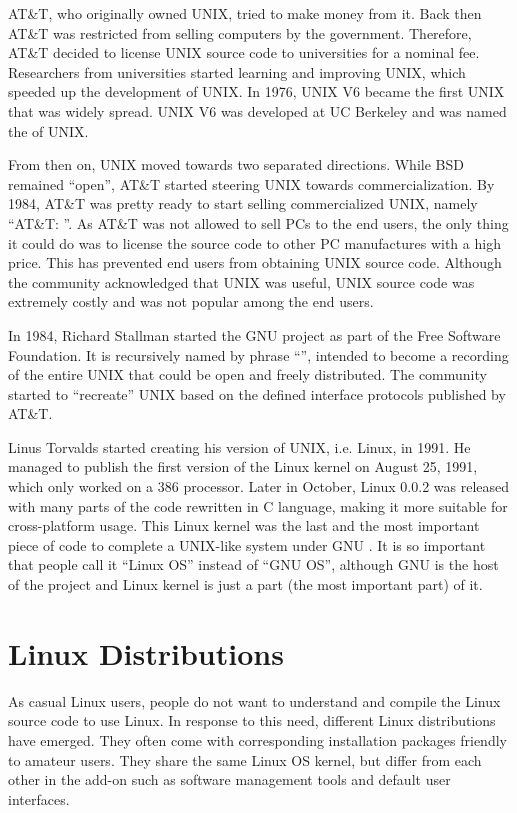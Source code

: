 AT\&T, who originally owned UNIX, tried to make money from it. Back then AT\&T was restricted from selling computers by the government. Therefore, AT\&T decided to license UNIX source code to universities for a nominal fee. Researchers from universities started learning and improving UNIX, which speeded up the development of UNIX. In 1976, UNIX V6 became the first UNIX that was widely spread. UNIX V6 was developed at UC Berkeley and was named the  of UNIX.

From then on, UNIX moved towards two separated directions. While BSD remained ``open'', AT\&T started steering UNIX towards commercialization. By 1984, AT\&T was pretty ready to start selling commercialized UNIX, namely ``AT\&T: ''. As AT\&T was not allowed to sell PCs to the end users, the only thing it could do was to license the source code to other PC manufactures with a high price. This has prevented end users from obtaining UNIX source code. Although the community acknowledged that UNIX was useful, UNIX source code was extremely costly and was not popular among the end users.

In 1984, Richard Stallman started the GNU project as part of the Free Software Foundation. It is recursively named by phrase ``'', intended to become a recording of the entire UNIX that could be open and freely distributed. The community started to ``recreate'' UNIX based on the defined interface protocols published by AT\&T.

Linus Torvalds started creating his version of UNIX, i.e. Linux, in 1991. He managed to publish the first version of the Linux kernel on August 25, 1991, which only worked on a 386 processor. Later in October, Linux 0.0.2 was released with many parts of the code rewritten in C language, making it more suitable for cross-platform usage. This Linux kernel was the last and the most important piece of code to complete a UNIX-like system under GNU . It is so important that people call it ``Linux OS'' instead of ``GNU OS'', although GNU is the host of the project and Linux kernel is just a part (the most important part) of it.

\section{Linux Distributions}

As casual Linux users, people do not want to understand and compile the Linux source code to use Linux. In response to this need, different Linux distributions have emerged. They often come with corresponding installation packages friendly to amateur users. They share the same Linux OS kernel, but differ from each other in the add-on such as software management tools and default user interfaces.


